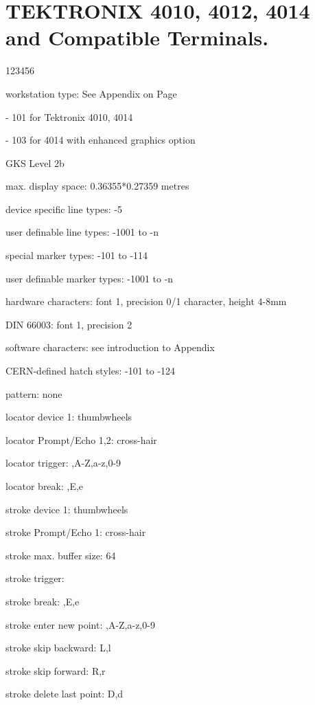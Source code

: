 \section{TEKTRONIX 4010, 4012, 4014 and Compatible Terminals.}
\begin{DLtt}{123456}
\item[workstation type:]See Appendix on Page~\pageref{sec:gtstyp}
\item[-]101 for Tektronix 4010, 4014
\item[-]103 for 4014 with enhanced graphics option
\item[GKS Level]2b
\item[max. display space:]0.36355*0.27359 metres
\item[device specific line types:]-5
\item[user definable line types:]-1001 to -n
\item[special marker types:]-101 to -114
\item[user definable marker types:]-1001 to -n
\item[hardware characters:]font 1, precision 0/1 character, height 4-8mm
\item[DIN 66003:]font 1, precision 2
\item[software characters:]see introduction to Appendix
\item[CERN-defined hatch styles:]-101 to -124
\item[pattern:]none
\item[locator device 1:]thumbwheels
\item[locator Prompt/Echo 1,2:]cross-hair
\item[locator trigger:],A-Z,a-z,0-9
\item[locator break:],E,e
\item[stroke device 1:]thumbwheels
\item[stroke Prompt/Echo 1:]cross-hair
\item[stroke max. buffer size:]64
\item[stroke trigger:]
\item[stroke break:],E,e
\item[stroke enter new point:],A-Z,a-z,0-9
\item[stroke skip backward:]L,l
\item[stroke skip forward:]R,r
\item[stroke delete last point:]D,d

\end{DLtt}
